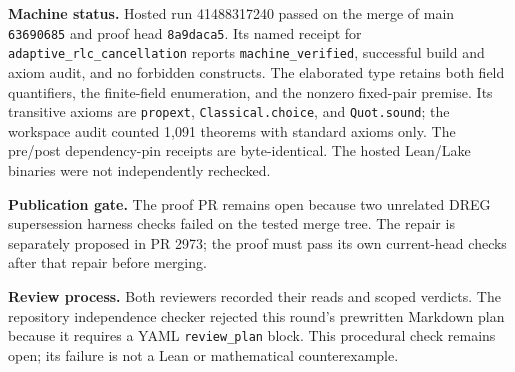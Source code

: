 \noindent\textbf{Machine status.} Hosted run 41488317240 passed on the merge
of main \texttt{63690685} and proof head \texttt{8a9daca5}. Its named receipt
for \texttt{adaptive\_rlc\_cancellation} reports \texttt{machine\_verified},
successful build and axiom audit, and no forbidden constructs. The elaborated
type retains both field quantifiers, the finite-field enumeration, and the
nonzero fixed-pair premise. Its transitive axioms are \texttt{propext},
\texttt{Classical.choice}, and \texttt{Quot.sound}; the workspace audit counted
1,091 theorems with standard axioms only. The pre/post dependency-pin receipts
are byte-identical. The hosted Lean/Lake binaries were not independently
rechecked.

\noindent\textbf{Publication gate.} The proof PR remains open because two
unrelated DREG supersession harness checks failed on the tested merge tree.
The repair is separately proposed in PR 2973; the proof must pass its own
current-head checks after that repair before merging.

\noindent\textbf{Review process.} Both reviewers recorded their reads and
scoped verdicts. The repository independence checker rejected this round's
prewritten Markdown plan because it requires a YAML \texttt{review\_plan}
block. This procedural check remains open; its failure is not a Lean or
mathematical counterexample.
